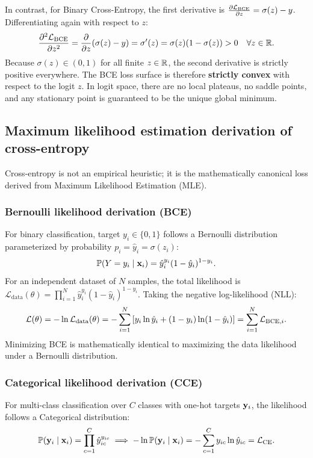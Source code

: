 \documentclass[../../main.tex]{subfiles}
\begin{document}
In contrast, for Binary Cross-Entropy, the first derivative is $\frac{\partial \mathcal{L}_{\text{BCE}}}{\partial z} = \sigma(z) - y$. Differentiating again with respect to $z$:
\begin{equation}
\label{eq:bce_second_derivative}
\frac{\partial^2 \mathcal{L}_{\text{BCE}}}{\partial z^2} = \frac{\partial}{\partial z} (\sigma(z) - y) = \sigma'(z) = \sigma(z)(1 - \sigma(z)) > 0 \quad \forall z \in \mathbb{R}.
\end{equation}
Because $\sigma(z) \in (0, 1)$ for all finite $z \in \mathbb{R}$, the second derivative is strictly positive everywhere. The BCE loss surface is therefore \textbf{strictly convex} with respect to the logit $z$. In logit space, there are no local plateaus, no saddle points, and any stationary point is guaranteed to be the unique global minimum.

\subsection{Maximum likelihood estimation derivation of cross-entropy}
Cross-entropy is not an empirical heuristic; it is the mathematically canonical loss derived from Maximum Likelihood Estimation (MLE).

\subsubsection{Bernoulli likelihood derivation (BCE)}
For binary classification, target $y_i \in \{0, 1\}$ follows a Bernoulli distribution parameterized by probability $p_i = \hat{y}_i = \sigma(z_i)$:
\begin{equation}
\mathbb{P}(Y = y_i \mid \mathbf{x}_i) = \hat{y}_i^{y_i} (1 - \hat{y}_i)^{1 - y_i}.
\end{equation}
For an independent dataset of $N$ samples, the total likelihood is $\mathcal{L}_{\text{data}}(\theta) = \prod_{i=1}^N \hat{y}_i^{y_i} (1 - \hat{y}_i)^{1 - y_i}$. Taking the negative log-likelihood (NLL):
\begin{equation}
\mathcal{L}(\theta) = - \ln \mathcal{L}_{\text{data}}(\theta) = - \sum_{i=1}^N \left[ y_i \ln \hat{y}_i + (1 - y_i) \ln(1 - \hat{y}_i) \right] = \sum_{i=1}^N \mathcal{L}_{\text{BCE}, i}.
\end{equation}
Minimizing BCE is mathematically identical to maximizing the data likelihood under a Bernoulli distribution.

\subsubsection{Categorical likelihood derivation (CCE)}
For multi-class classification over $C$ classes with one-hot targets $\mathbf{y}_i$, the likelihood follows a Categorical distribution:
\begin{equation}
\mathbb{P}(\mathbf{y}_i \mid \mathbf{x}_i) = \prod_{c=1}^C \hat{y}_{ic}^{y_{ic}} \implies - \ln \mathbb{P}(\mathbf{y}_i \mid \mathbf{x}_i) = - \sum_{c=1}^C y_{ic} \ln \hat{y}_{ic} = \mathcal{L}_{\text{CE}}.
\end{equation}
\end{document}
